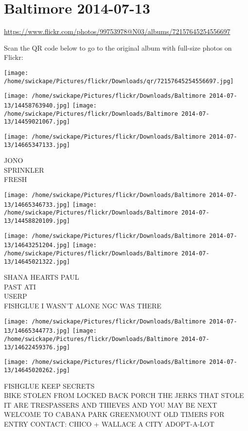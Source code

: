 \documentclass[10pt,letterpaper]{article}
\title{}
\author{}
\date{}
\begin{document}
\section*{Baltimore 2014-07-13}

\url{https://www.flickr.com/photos/99753978@N03/albums/72157645254556697}

Scan the QR code below to go to the original album with full-size photos on Flickr:

\texttt{[image: /home/swickape/Pictures/flickr/Downloads/qr/72157645254556697.jpg]}
\pagebreak

\texttt{[image: /home/swickape/Pictures/flickr/Downloads/Baltimore 2014-07-13/14458763940.jpg]}
\texttt{[image: /home/swickape/Pictures/flickr/Downloads/Baltimore 2014-07-13/14459021067.jpg]}

\vspace{0.25in}
\texttt{[image: /home/swickape/Pictures/flickr/Downloads/Baltimore 2014-07-13/14665347133.jpg]}

JONO\\
SPRINKLER\\
FRESH
\pagebreak

\texttt{[image: /home/swickape/Pictures/flickr/Downloads/Baltimore 2014-07-13/14665346733.jpg]}
\texttt{[image: /home/swickape/Pictures/flickr/Downloads/Baltimore 2014-07-13/14458820109.jpg]}

\texttt{[image: /home/swickape/Pictures/flickr/Downloads/Baltimore 2014-07-13/14643251204.jpg]}
\texttt{[image: /home/swickape/Pictures/flickr/Downloads/Baltimore 2014-07-13/14645021322.jpg]}

SHANA HEARTS PAUL\\
PAST ATI\\
USERP\\
FISHGLUE I WASN'T ALONE NGC WAS THERE
\pagebreak

\texttt{[image: /home/swickape/Pictures/flickr/Downloads/Baltimore 2014-07-13/14665344773.jpg]}
\texttt{[image: /home/swickape/Pictures/flickr/Downloads/Baltimore 2014-07-13/14622459376.jpg]}

\vspace{0.25in}
\texttt{[image: /home/swickape/Pictures/flickr/Downloads/Baltimore 2014-07-13/14645020262.jpg]}

FISHGLUE KEEP SECRETS\\
BIKE STOLEN FROM LOCKED BACK PORCH THE JERKS THAT STOLE IT ARE TRESPASSERS AND THIEVES AND YOU MAY BE NEXT\\
WELCOME TO CABANA PARK GREENMOUNT OLD TIMERS FOR ENTRY CONTACT: CHICO + WALLACE A CITY ADOPT{-}A{-}LOT
\pagebreak
\end{document}
